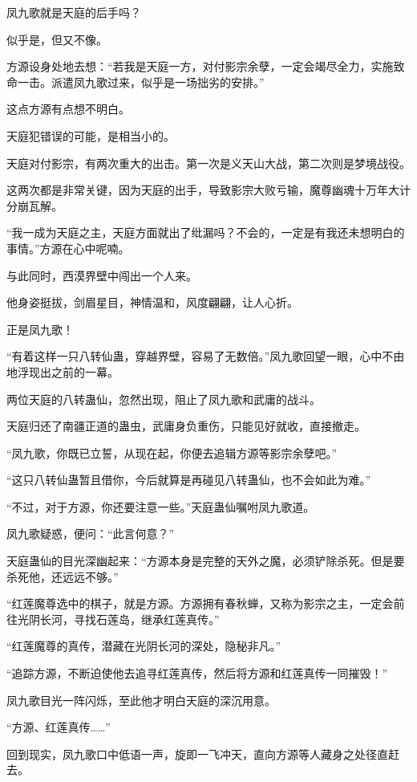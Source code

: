 \begin{this_body}
凤九歌就是天庭的后手吗？

似乎是，但又不像。

方源设身处地去想：“若我是天庭一方，对付影宗余孽，一定会竭尽全力，实施致命一击。派遣凤九歌过来，似乎是一场拙劣的安排。”

这点方源有点想不明白。

天庭犯错误的可能，是相当小的。

天庭对付影宗，有两次重大的出击。第一次是义天山大战，第二次则是梦境战役。

这两次都是非常关键，因为天庭的出手，导致影宗大败亏输，魔尊幽魂十万年大计分崩瓦解。

“我一成为天庭之主，天庭方面就出了纰漏吗？不会的，一定是有我还未想明白的事情。”方源在心中呢喃。

与此同时，西漠界壁中闯出一个人来。

他身姿挺拔，剑眉星目，神情温和，风度翩翩，让人心折。

正是凤九歌！

“有着这样一只八转仙蛊，穿越界壁，容易了无数倍。”凤九歌回望一眼，心中不由地浮现出之前的一幕。

两位天庭的八转蛊仙，忽然出现，阻止了凤九歌和武庸的战斗。

天庭归还了南疆正道的蛊虫，武庸身负重伤，只能见好就收，直接撤走。

“凤九歌，你既已立誓，从现在起，你便去追辑方源等影宗余孽吧。”

“这只八转仙蛊暂且借你，今后就算是再碰见八转蛊仙，也不会如此为难。”

“不过，对于方源，你还要注意一些。”天庭蛊仙嘱咐凤九歌道。

凤九歌疑惑，便问：“此言何意？”

天庭蛊仙的目光深幽起来：“方源本身是完整的天外之魔，必须铲除杀死。但是要杀死他，还远远不够。”

“红莲魔尊选中的棋子，就是方源。方源拥有春秋蝉，又称为影宗之主，一定会前往光阴长河，寻找石莲岛，继承红莲真传。”

“红莲魔尊的真传，潜藏在光阴长河的深处，隐秘非凡。”

“追踪方源，不断迫使他去追寻红莲真传，然后将方源和红莲真传一同摧毁！”

凤九歌目光一阵闪烁，至此他才明白天庭的深沉用意。

“方源、红莲真传……”

回到现实，凤九歌口中低语一声，旋即一飞冲天，直向方源等人藏身之处径直赶去。

\end{this_body}

